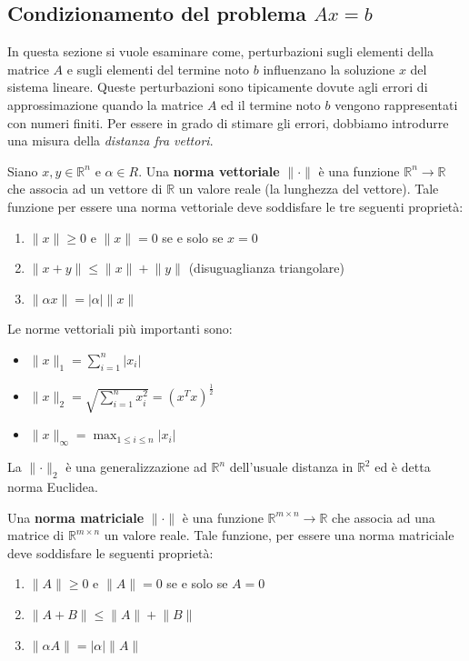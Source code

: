 \documentclass{article}
\begin{document}
\subsection{Condizionamento del problema $Ax=b$}
In questa sezione si vuole esaminare come, perturbazioni sugli elementi della
matrice $A$ e sugli elementi del termine noto $b$ influenzano la soluzione $x$
del sistema lineare. Queste perturbazioni sono tipicamente dovute agli errori
di approssimazione quando la matrice $A$ ed il termine noto $b$ vengono
rappresentati con numeri finiti. Per essere in grado di stimare gli errori,
dobbiamo introdurre una misura della \textit{distanza fra vettori}.
\begin{definition}
    Siano $x,y\in \mathbb{R}^n$ e $\alpha\in R$. Una \textbf{norma vettoriale}
    $\lVert \cdot \rVert$ è una funzione $\mathbb{R}^n\to \mathbb{R}$ che
    associa ad un vettore di $\mathbb{R}$ un valore reale (la lunghezza del
    vettore). Tale funzione per essere una norma vettoriale deve soddisfare le
    tre seguenti proprietà:
    \begin{enumerate}
        \item $\lVert x\rVert\geq 0$ e $\lVert x\rVert=0$ se e solo se $x=0$
        \item $\lVert x+y\rVert\leq \lVert x\rVert+\lVert y\rVert$
            (disuguaglianza triangolare)
        \item $\lVert \alpha x\rVert=\left\lvert \alpha\right\rvert \lVert
            x\rVert$
    \end{enumerate}
\end{definition}
Le norme vettoriali più importanti sono:
\begin{itemize}
    \item $\lVert x\rVert_1=\displaystyle\sum_{i=1}^{n}\left\lvert x_i\right\rvert$ 
    \item $\lVert
        x\rVert_2=\sqrt{\displaystyle\sum_{i=1}^{n}x_i^2}=(x^Tx)^{\frac{1}{2}}$
    \item $\lVert x\rVert_{\infty}=\max_{1\leq i\leq n}\left\lvert x_i\right\rvert$
\end{itemize}
La $\lVert \cdot\rVert_2$ è una generalizzazione ad $\mathbb{R}^n$ dell'usuale distanza in $\mathbb{R}^2$ ed è detta norma
Euclidea.
\begin{definition}
    Una \textbf{norma matriciale} $\lVert \cdot\rVert$ è una funzione
    $\mathbb{R}^{m\times n}\to \mathbb{R}$ che associa ad una matrice di
    $\mathbb{R}^{m\times n}$ un valore reale. Tale funzione, per essere una
    norma matriciale deve soddisfare le seguenti proprietà:
    \begin{enumerate}
        \item $\lVert A\rVert\geq0$ e $\lVert A\rVert=0$ se e solo se $A=0$
        \item $\lVert A+B\rVert\leq \lVert A\rVert+\lVert B\rVert$
        \item $\lVert \alpha A\rVert=\left\lvert \alpha\right\rvert \lVert A\rVert$
    \end{enumerate}
\end{definition}
\end{document}
